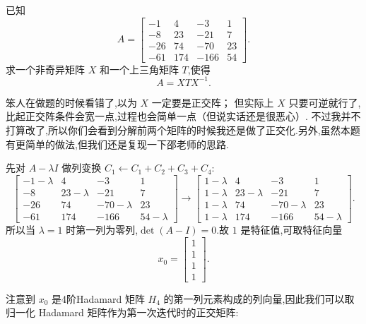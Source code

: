 \begin{problem}
已知
\[
A=
\begin{bmatrix}
-1 & 4 & -3 & 1 \\
-8 & 23 & -21 & 7 \\
-26 & 74 & -70 & 23 \\
-61 & 174 & -166 & 54
\end{bmatrix}.
\]
求一个非奇异矩阵 $X$ 和一个上三角矩阵 $T$,使得
\[
A = XTX^{-1}.
\]

\begin{solution}
\begin{solnote}
笨人在做题的时候看错了,以为 $X$ 一定要是正交阵；
但实际上 $X$ 只要可逆就行了,比起正交阵条件会宽一点,过程也会简单一点（但说实话还是很恶心）.
不过我并不打算改了,所以你们会看到分解前两个矩阵的时候我还是做了正交化.另外,虽然本题有更简单的做法,但我们还是复现一下邵老师的思路.
\end{solnote}

先对 $A-\lambda I$ 做列变换 $C_1\leftarrow C_1+C_2+C_3+C_4$:
\[
\begin{bmatrix}
-1 - \lambda & 4 & -3 & 1 \\
-8 & 23 - \lambda & -21 & 7 \\
-26 & 74 & -70 - \lambda & 23 \\
-61 & 174 & -166 & 54 - \lambda
\end{bmatrix}
\longrightarrow
\begin{bmatrix}
1-\lambda & 4 & -3 & 1 \\
1-\lambda & 23-\lambda & -21 & 7 \\
1-\lambda & 74 & -70-\lambda & 23 \\
1-\lambda & 174 & -166 & 54-\lambda
\end{bmatrix}.
\]
所以当 $\lambda=1$ 时第一列为零列,$\det(A-I)=0$.故 $1$ 是特征值,可取特征向量
\[
x_0=\begin{bmatrix}1\\1\\1\\1\end{bmatrix}.
\]

注意到 $x_0$ 是4阶Hadamard 矩阵 $H_4$ 的第一列元素构成的列向量,因此我们可以取归一化 Hadamard 矩阵作为第一次迭代时的正交矩阵:


\end{solution}
\end{problem}
